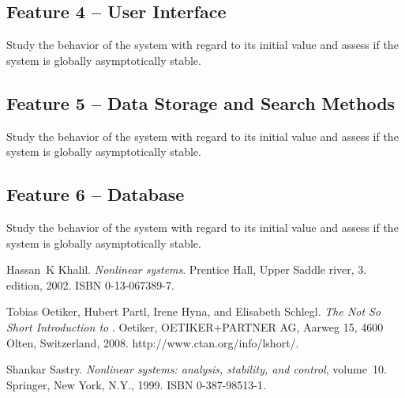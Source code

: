 \documentclass[a4paper]{article} %
\begin{document}
\subsection*{Feature 4 -- User Interface}
\label{task1:feature4}

Study the behavior of the system with regard to its initial value and assess if the system is globally asymptotically stable.

\subsection*{Feature 5 -- Data Storage and Search Methods}
\label{task1:feature5}

Study the behavior of the system with regard to its initial value and assess if the system is globally asymptotically stable.

\subsection*{Feature 6 -- Database}
\label{task1:feature6}

Study the behavior of the system with regard to its initial value and assess if the system is globally asymptotically stable.



\begin{thebibliography}{99}
Hassan~K Khalil.
\newblock \emph{Nonlinear systems}.
\newblock Prentice Hall, Upper Saddle river, 3. edition, 2002.
\newblock ISBN 0-13-067389-7.

Tobias Oetiker, Hubert Partl, Irene Hyna, and Elisabeth Schlegl.
\newblock \emph{The Not So Short Introduction to \LaTeXe}.
\newblock Oetiker, OETIKER+PARTNER AG, Aarweg 15, 4600 Olten, Switzerland,
  2008.
\newblock http://www.ctan.org/info/lshort/.

Shankar Sastry.
\newblock \emph{Nonlinear systems: analysis, stability, and control},
  volume~10.
\newblock Springer, New York, N.Y., 1999.
\newblock ISBN 0-387-98513-1.
\end{thebibliography}



\clearpage %
\end{document}
